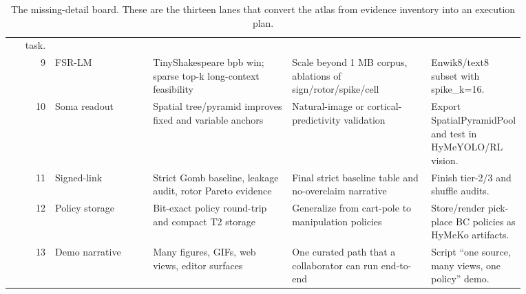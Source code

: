 \documentclass[10pt]{article}
\begin{document}
\begin{table}[!htbp]
\begin{tabular}{rp{0.19\linewidth}p{0.27\linewidth}p{0.27\linewidth}p{0.14\linewidth}}
task. \\
9 & FSR-LM & TinyShakespeare bpb win; sparse top-k long-context feasibility &
Scale beyond 1 MB corpus, ablations of sign/rotor/spike/cell & Enwik8/text8
subset with spike\_k=16. \\
10 & Soma readout & Spatial tree/pyramid improves fixed and variable anchors &
Natural-image or cortical-predictivity validation & Export
SpatialPyramidPool and test in HyMeYOLO/RL vision. \\
11 & Signed-link & Strict Gomb baseline, leakage audit, rotor Pareto evidence &
Final strict baseline table and no-overclaim narrative & Finish tier-2/3 and
shuffle audits. \\
12 & Policy storage & Bit-exact policy round-trip and compact T2 storage &
Generalize from cart-pole to manipulation policies & Store/render pick-place
BC policies as HyMeKo artifacts. \\
13 & Demo narrative & Many figures, GIFs, web views, editor surfaces & One
curated path that a collaborator can run end-to-end & Script ``one source,
many views, one policy'' demo. \\
\bottomrule
\end{tabular}
\caption{The missing-detail board. These are the thirteen lanes that convert the
atlas from evidence inventory into an execution plan.}
\end{table}
\end{document}
